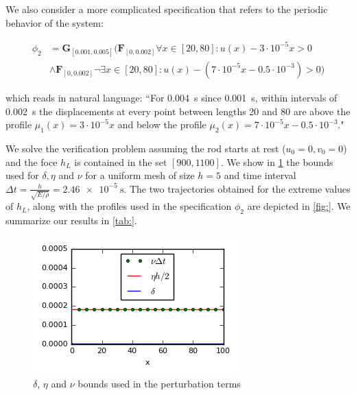 \documentclass[letterpaper, 10 pt, conference]{ieeeconf/ieeeconf}
\newcommand{\Always}{\mathbf{G}}
\newcommand{\Event}{\mathbf{F}}
\begin{document}
We also consider a more complicated specification that refers to the periodic
behavior of the system:

\begin{equation}
\begin{aligned}
    \phi_2 &= \Always_{[0.001, 0.005]} \bigl( \Event_{[0, 0.002]} \forall x \in [20,
    80]: u(x) - 3 \cdot 10^{-5} x > 0 \\
    &\land \Event_{[0, 0.002]} \lnot \exists x
    \in [20, 80]: u(x) - (7 \cdot 10^{-5}x - 0.5 \cdot 10^{-3}) > 0\bigr)
\end{aligned}
\end{equation}

which reads in natural language: ``For \SI{0.004}{\second} since
\SI{0.001}{\second}, within intervals of \SI{0.002}{\second} the displacements
at every point between lengths \SI{20}{} and \SI{80}{} are above the profile
$\mu_1(x) = 3 \cdot 10^{-5} x$ and below the profile $\mu_2(x) = 7 \cdot 10^{-5} x
- 0.5 \cdot 10^{-3}$."

We solve the verification problem assuming the rod starts at rest ($u_0 = 0,
v_0 = 0$) and the foce $h_L$ is contained in the set $[900, 1100]$. We show in
\cref{fig:bounds_mech} the bounds used for $\delta, \eta$ and $\nu$ for a
uniform mesh of size $h=5$ and time interval $\Delta t = \frac{h}{\sqrt{E
/ \rho}} = \SI{2.46e-5}{\second}$. The two trajectories
obtained for the extreme values of $h_L$, along with the profiles used in the
specification $\phi_2$ are depicted in \cref{fig:}. We summarize our results in \cref{tab:}.

\begin{figure}
    \centering
    \begin{minipage}[c]{0.5\columnwidth}
        \includegraphics[width=\textwidth]{figures/pert_plot_mech.png}
    \end{minipage}\hfill
    \begin{minipage}[c]{0.5\columnwidth}
        \caption{$\delta$, $\eta$ and $\nu$ bounds used in the perturbation terms}
        \label{fig:bounds_mech}
    \end{minipage}
\end{figure}
\end{document}
